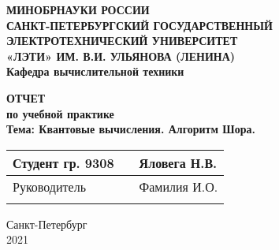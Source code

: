 \clearpage
\begin{center}
	\textbf{	
	МИНОБРНАУКИ РОССИИ\\
	САНКТ-ПЕТЕРБУРГСКИЙ ГОСУДАРСТВЕННЫЙ\\
	ЭЛЕКТРОТЕХНИЧЕСКИЙ УНИВЕРСИТЕТ\\
	«ЛЭТИ» ИМ. В.И. УЛЬЯНОВА (ЛЕНИНА)\\
	Кафедра вычислительной техники}

	\vspace{54mm}
	
	\textbf{
	ОТЧЕТ\\
	по учебной практике \\
	Тема: Квантовые вычисления. Алгоритм Шора. \\}

	\vspace{65mm}

	\def\arraystretch{1.5}
	\begin{tabularx}{\textwidth}{ >{\hsize=7cm}X >{\hsize=4cm}X  >{\centering\arraybackslash}X }
		Студент гр. 9308 & & Яловега Н.В. \\ \cline{2-2}
		Руководитель & & Фамилия И.О. \\ \cline{2-2}
	\end{tabularx}
	\def\arraystretch{1}

	\vfill
	Санкт-Петербург\\
	2021
\end{center}
\newpage
{}
\setcounter{page}{2}

